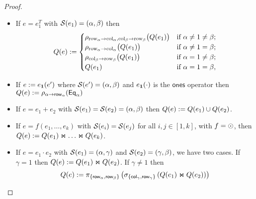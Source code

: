 \begin{proof}
\begin{itemize}
  \item If $e=e_1^T$ with $\mathcal{S} (e_1)=(\alpha, \beta)$ then \[
Q(e) :=
\begin{cases}
\rho_{\mathrm{row}_\alpha \to \mathrm{col}_\alpha,\mathrm{col}_\beta \to \mathrm{row}_\beta}\bigl(Q(e_1)\bigr) & \text{if } \alpha \neq 1 \neq \beta; \cr
\rho_{\mathrm{row}_\alpha \to \mathrm{col}_\alpha}\bigl(Q(e_1)\bigr) & \text{if } \alpha \neq 1 = \beta; \cr
\rho_{\mathrm{col}_\beta \to \mathrm{row}_\beta}\bigl(Q(e_1)\bigr) & \text{if } \alpha = 1 \neq \beta; \cr
Q(e_1) & \text{if } \alpha = 1 = \beta,
\end{cases}
\]

  \item If $e:=e_{\mathbf{1}}(e')$ where $\mathcal{S}(e')=(\alpha, \beta)$ and $e_{\mathbf{1}}(\cdot)$ is the $\mathsf{ones}$ operator
  then $Q(e):=\rho_{\alpha\rightarrow\mathsf{row}_\alpha}(\mathsf{Eq}_{\alpha})$

  \item If $e=e_1+e_2$ with $\mathcal{S} (e_1)=\mathcal{S} (e_2)=(\alpha, \beta)$ then $Q (e):=Q (e_1)\cup Q (e_2)$.

  \item If $e=f(e_1,\ldots, e_k)$ with $\mathcal{S}(e_i)=\mathcal{S}(e_j)$ for all $i,j\in[1,k]$, with $f=\odot$, then $Q(e):=Q(e_1)\Join \ldots \Join Q(e_k)$.

  \item If $e=e_1\cdot e_2$ with $\mathcal{S} (e_1)=(\alpha, \gamma)$ and $\mathcal{S} (e_2)=(\gamma, \beta)$, we have two cases. If $\gamma = 1$ then $Q (e):=Q (e_1)\Join Q (e_2)$.
If $\gamma\neq 1$ then
$$
Q (e) := \pi_{\lbrace \mathsf{row}_{\alpha},\mathsf{row}_{\beta} \rbrace}\left( \sigma_{\lbrace \mathsf{col}_\gamma, \mathsf{row}_\gamma \rbrace} \left( Q (e_1)\Join Q (e_2) \right) \right)
$$


\end{itemize}
\end{proof}
